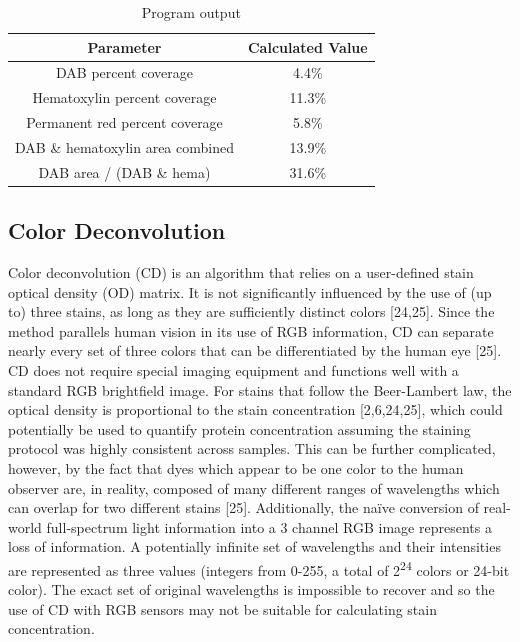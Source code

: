 \documentclass[12pt]{article}
\begin{document}
\begin{table}[]
\centering
\caption{Program output}
\label{program output}
\begin{tabular}{|c|c|}
\hline
\textbf{Parameter}               & \textbf{Calculated Value} \\ \hline
DAB percent coverage             & 4.4\%                     \\ \hline
Hematoxylin percent coverage     & 11.3\%                    \\ \hline
Permanent red percent coverage   & 5.8\%                     \\ \hline
DAB \& hematoxylin area combined & 13.9\%                    \\ \hline
DAB area / (DAB \& hema)                         & 31.6\%                    \\ \hline
\end{tabular}
\end{table}


\subsection*{Color Deconvolution}

Color deconvolution (CD) is an algorithm that relies on a user-defined stain optical density (OD) matrix. It is not significantly influenced by the use of (up to) three stains, as long as they are sufficiently distinct colors [24,25]. Since the method parallels human vision in its use of RGB information, CD can separate nearly every set of three colors that can be differentiated by the human eye [25]. CD does not require special imaging equipment and functions well with a standard RGB brightfield image. For stains that follow the Beer-Lambert law, the optical density is proportional to the stain concentration [2,6,24,25], which could potentially be used to quantify protein concentration assuming the staining protocol was highly consistent across samples. This can be further complicated, however, by the fact that dyes which appear to be one color to the human observer are, in reality, composed of many different ranges of wavelengths which can overlap for two different stains [25]. Additionally, the naïve conversion of real-world full-spectrum light information into a 3 channel RGB image represents a loss of information. A potentially infinite set of wavelengths and their intensities are represented as three values (integers from 0-255, a total of 2\textsuperscript{24} colors or 24-bit color). The exact set of original wavelengths is impossible to recover and so the use of CD with RGB sensors may not be suitable for calculating stain concentration.
\end{document}
